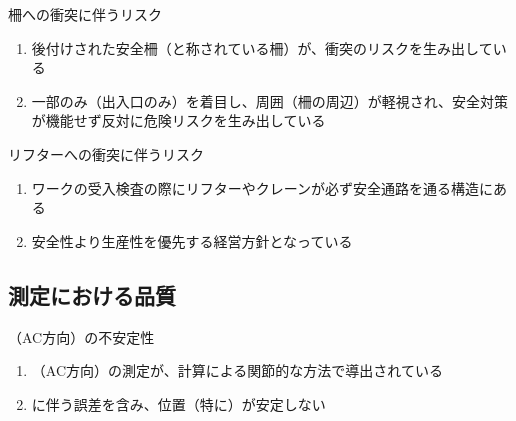 \begin{Issues}{柵への衝突に伴うリスク}
\begin{enumerate}[label=\sarrow]
\item 後付けされた安全柵（と称されている柵）が、衝突のリスクを生み出している
\item 一部のみ（出入口のみ）を着目し、周囲（柵の周辺）が軽視され、安全対策が機能せず反対に危険リスクを生み出している
\end{enumerate}
\end{Issues}

\clearpage
\begin{Issues}{リフターへの衝突に伴うリスク}
\begin{enumerate}[label=\sarrow]
\item ワークの受入検査の際にリフターやクレーンが必ず安全通路を通る構造にある
\item 安全性より生産性を優先する経営方針となっている
\end{enumerate}
\end{Issues}


\clearpage


\subsection{測定における品質}

\begin{Issues}{\KeywayCenterMeasurement（AC方向）の不安定性}
\begin{enumerate}[label=\sarrow]
\item[{\sarrow[red]}]\KeywayCenter（AC方向）の測定が、計算による関節的な方法で導出されている
\item[{\sarrow[red]}]\CenterCurvature に伴う誤差を含み、位置（特に\AsideKeywayDepth）が安定しない
\end{enumerate}
\end{Issues}


